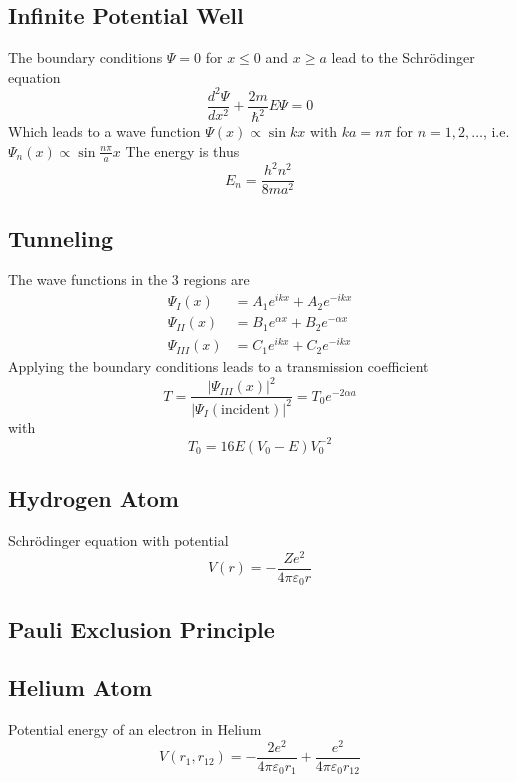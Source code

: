 \subsection{Infinite Potential Well}
The boundary conditions $\Psi=0$ for $x\leq 0$ and $x\geq a$ lead to the Schrödinger equation
\begin{equation}
    \frac{d^2 \Psi}{d x^2} + \frac{2m}{\hbar^2} E \Psi = 0
\end{equation}
Which leads to a wave function $\Psi(x) \propto \sin kx$ with $ka=n\pi$ for $n=1,2,\ldots$, i.e. $\Psi_n(x) \propto \sin\frac{n\pi}{a}x$
The energy is thus
\begin{equation}
    E_n = \frac{h^2 n^2}{8 m a^2}
\end{equation}

\subsection{Tunneling}
\begin{figure}[htbp]
    \centering
    
\end{figure}

The wave functions in the 3 regions are
\begin{align}
    \Psi_{I}(x) &= A_1 e^{ikx} + A_2 e^{-ikx} \\
    \Psi_{II}(x) &= B_1 e^{\alpha x} + B_2 e^{-\alpha x} \\
    \Psi_{III}(x) &= C_1 e^{ikx} + C_2 e^{-ikx} 
\end{align}
Applying the boundary conditions leads to a transmission coefficient
\begin{equation}
    T = \frac{\left| \Psi_{III}(x) \right|^2}{\left| \Psi_{I}(\text{incident}) \right|^2} = T_0 e^{-2\alpha a}
\end{equation}
with
\begin{equation}
    T_0 = 16 E(V_0-E)V_0^{-2}
\end{equation}

\subsection{Hydrogen Atom}
Schrödinger equation with potential
\begin{equation}
    V(r) = -\frac{Z e^2}{4 \pi \varepsilon_0 r}
\end{equation}

\subsection{Pauli Exclusion Principle}

\subsection{Helium Atom}
Potential energy of an electron in Helium
\begin{equation}
    V(r_1,r_{12}) = -\frac{2e^2}{4 \pi \varepsilon_0 r_1} + \frac{e^2}{4 \pi \varepsilon_0 r_{12}}
\end{equation}
